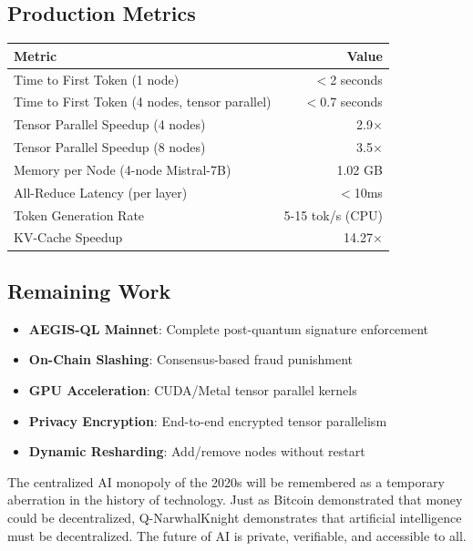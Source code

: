 \documentclass[11pt,a4paper]{article}
\begin{document}
\subsection{Production Metrics}

\begin{table}[H]
\centering
\begin{tabular}{|l|r|}
\hline
\textbf{Metric} & \textbf{Value} \\
\hline
Time to First Token (1 node) & $<$2 seconds \\
Time to First Token (4 nodes, tensor parallel) & $<$0.7 seconds \\
Tensor Parallel Speedup (4 nodes) & 2.9$\times$ \\
Tensor Parallel Speedup (8 nodes) & 3.5$\times$ \\
Memory per Node (4-node Mistral-7B) & 1.02 GB \\
All-Reduce Latency (per layer) & $<$10ms \\
Token Generation Rate & 5-15 tok/s (CPU) \\
KV-Cache Speedup & 14.27$\times$ \\
\hline
\end{tabular}
\end{table}

\subsection{Remaining Work}

\begin{itemize}
    \item \textbf{AEGIS-QL Mainnet}: Complete post-quantum signature enforcement
    \item \textbf{On-Chain Slashing}: Consensus-based fraud punishment
    \item \textbf{GPU Acceleration}: CUDA/Metal tensor parallel kernels
    \item \textbf{Privacy Encryption}: End-to-end encrypted tensor parallelism
    \item \textbf{Dynamic Resharding}: Add/remove nodes without restart
\end{itemize}

The centralized AI monopoly of the 2020s will be remembered as a temporary aberration in the history of technology. Just as Bitcoin demonstrated that money could be decentralized, Q-NarwhalKnight demonstrates that artificial intelligence must be decentralized. The future of AI is private, verifiable, and accessible to all.
\end{document}
